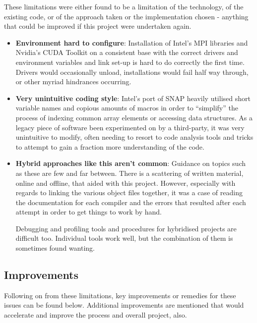 \documentclass[conference]{IEEEtran}
\begin{document}
These limitations were either found to be a limitation of the technology, of the existing code, or of the approach taken or the implementation chosen - anything that could be improved if this project were undertaken again.

\begin{itemize}
    \item \textbf{Environment hard to configure}: Installation of Intel's MPI libraries and Nvidia's CUDA Toolkit on a consistent base with the correct drivers and environment variables and link set-up is hard to do correctly the first time. Drivers would occasionally unload, installations would fail half way through, or other myriad hindrances occurring.
    \item \textbf{Very unintuitive coding style}: Intel's port of SNAP heavily utilised short variable names and copious amounts of macros in order to ``simplify'' the process of indexing common array elements or accessing data structures. As a legacy piece of software been experimented on by a third-party, it was very unintuitive to modify, often needing to resort to code analysis tools and tricks to attempt to gain a fraction more understanding of the code.
    \item \textbf{Hybrid approaches like this aren't common}: Guidance on topics such as these are few and far between. There is a scattering of written material, online and offline, that aided with this project. However, especially with regards to linking the various object files together, it was a case of reading the documentation for each compiler and the errors that resulted after each attempt in order to get things to work by hand.

    Debugging and profiling tools and procedures for hybridised projects are difficult too. Individual tools work well, but the combination of them is sometimes found wanting.
\end{itemize}

\subsection{Improvements}

Following on from these limitations, key improvements or remedies for these issues can be found below. Additional improvements are mentioned that would accelerate and improve the process and overall project, also.
\end{document}
